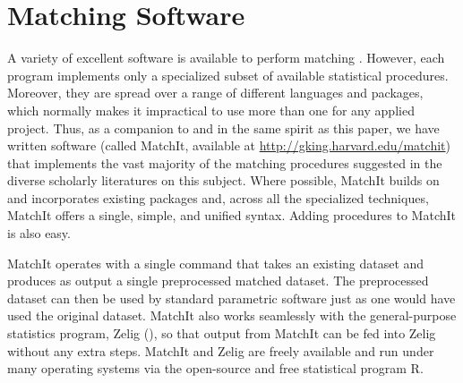 \documentclass[11pt,titlepage]{article}
\begin{document}
\section{Matching Software}\label{s:matchit}

A variety of excellent software is available to perform matching
\citep{AbaDruLeb02, BecIch02, BerKos03, Hansen05, LeuSia04, Parsons00,
  Parsons01, Sekhon04}.  However, each program implements only a
specialized subset of available statistical procedures.  Moreover,
they are spread over a range of different languages and packages,
which normally makes it impractical to use more than one for any
applied project.  Thus, as a companion to and in the same spirit as
this paper, we have written software (called MatchIt, available at
\url{http://gking.harvard.edu/matchit}) that implements the vast
majority of the matching procedures suggested in the diverse scholarly
literatures on this subject.  Where possible, MatchIt builds on and
incorporates existing packages and, across all the specialized
techniques, MatchIt offers a single, simple, and unified syntax.
Adding procedures to MatchIt is also easy.

MatchIt operates with a single command that takes an existing dataset
and produces as output a single preprocessed matched dataset.  The
preprocessed dataset can then be used by standard parametric software
just as one would have used the original dataset.  MatchIt also works
seamlessly with the general-purpose statistics program, Zelig
(\citealt{ImaKinLau04}), so that output from MatchIt can be fed into
Zelig without any extra steps.  MatchIt and Zelig are freely available
and run under many operating systems via the open-source and free
statistical program R.



\end{document}
